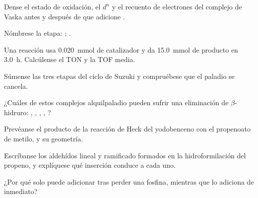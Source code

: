 \begin{exercise}[$\star$]\label{exo:b2:catalytic-cycles:1}
Dense el estado de oxidación, el $d^n$ y el recuento de electrones del complejo de Vaska
 antes y después de que adicione .
\end{exercise}

\begin{exercise}[$\star$]\label{exo:b2:catalytic-cycles:2}
Nómbrese la etapa: ; .
\end{exercise}

\begin{exercise}[$\star$]\label{exo:b2:catalytic-cycles:3}
Una reacción usa \qty{0.020}{mmol} de catalizador y da \qty{15.0}{mmol} de producto en
\qty{3.0}{h}. Calcúlense el TON y la TOF media.
\end{exercise}

\begin{exercise}[$\star$]\label{exo:b2:catalytic-cycles:4}
Súmense las tres etapas del ciclo de Suzuki y compruébese que el paladio se cancela.
\end{exercise}

\begin{exercise}[$\star\star$]\label{exo:b2:catalytic-cycles:5}
¿Cuáles de estos complejos alquilpaladio pueden sufrir una eliminación de $\beta$-hidruro:
, , , , ?
\end{exercise}

\begin{exercise}[$\star\star$]\label{exo:b2:catalytic-cycles:6}
Prevéanse el producto de la reacción de Heck del yodobenceno con el propenoato de metilo, y su
geometría.
\end{exercise}

\begin{exercise}[$\star\star$]\label{exo:b2:catalytic-cycles:7}
Escríbanse los aldehídos lineal y ramificado formados en la hidroformilación del propeno, y
explíquese qué inserción conduce a cada uno.
\end{exercise}

\begin{exercise}[$\star\star$]\label{exo:b2:catalytic-cycles:8}
¿Por qué  solo puede adicionar  tras perder una fosfina, mientras que
 lo adiciona de inmediato?
\end{exercise}

